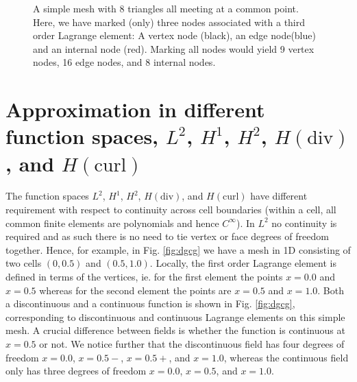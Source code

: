 \begin{figure}
\begin{tikzpicture}[scale=3]
\end{tikzpicture}
\label{fig:Lagrange8elements}
\caption{A simple mesh with 8 triangles all meeting at a common point. 
Here, we have marked (only) three nodes associated with a third order Lagrange element: A vertex node (black), an edge node(blue) and an internal node (red).  
Marking all nodes would yield 9 vertex nodes,  16 edge nodes, and 8 internal nodes.  }
\end{figure}






\section{Approximation in different function spaces, $L^2$, $H^1$, $H^2$, $H(\mbox{div})$, and $H(\mbox{curl})$ }

The function spaces 
$L^2$, $H^1$, $H^2$, $H(\mbox{div})$, and $H(\mbox{curl})$ 
have different requirement with respect to continuity across cell boundaries (within a cell, all common finite elements are 
polynomials and hence $C^\infty$). In $L^2$ no continuity is required and as such there is no need to tie vertex or face
degrees of freedom together. Hence, for example, in Fig. \ref{fig:dgcg} we have a mesh in 1D consisting of two cells $(0, 0.5)$ and
$(0.5, 1.0)$. Locally, the first order Lagrange element is defined in terms of the vertices, ie. for the first element the points
$x=0.0$ and $x=0.5$ whereas for the second element the points are $x=0.5$ and $x=1.0$. Both a discontinuous and a continuous
function is shown in Fig. \ref{fig:dgcg}, corresponding to discontinuous and continuous Lagrange elements on this simple mesh. 
A crucial difference between fields is whether the function is continuous at $x=0.5$ or not. 
We notice further that the discontinuous field has four degrees of freedom $x=0.0$, $x=0.5-$, $x=0.5+$, and $x=1.0$, whereas
the continuous field only has three degrees of freedom $x=0.0$, $x=0.5$, and $x=1.0$. 

